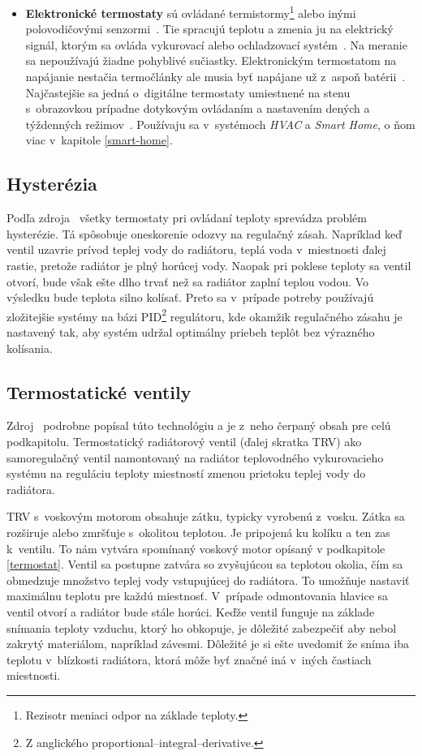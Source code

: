 \begin{itemize}
\item \textbf{Elektronické termostaty} sú ovládané termistormy\footnote{Rezisotr meniaci odpor na základe teploty.} alebo inými polovodičovými senzormi~\cite{challi_heating_2020}. 
Tie spracujú teplotu a zmenia ju na elektrický signál, ktorým sa ovláda vykurovací alebo ochladzovací systém~\cite{challi_heating_2020,robinson_2022}. 
Na meranie sa nepoužívajú žiadne pohyblivé sučiastky. 
Elektronickým termostatom na napájanie nestačia termočlánky ale musia byť napájane už z~aspoň batérii~\cite{robinson_2022}. 
Najčastejšie sa jedná o~digitálne termostaty umiestnené na stenu s~obrazovkou prípadne dotykovým ovládaním a nastavením dených a týždenných režimov~\cite{robinson_2022}. 
Používaju sa v~systémoch \emph{HVAC} a \emph{Smart Home}, o ňom viac v~kapitole \ref{smart-home}.
\end{itemize}

\subsection{Hysterézia}\label{Hyster}
Podľa zdroja~\cite{cadence_2022} všetky termostaty pri ovládaní teploty sprevádza problém hysterézie. 
Tá spôsobuje oneskorenie odozvy na regulačný zásah. 
Napríklad keď ventil uzavrie prívod teplej vody do radiátoru, teplá voda v~miestnosti ďalej rastie, pretože radiátor je plný horúcej vody. 
Naopak pri poklese teploty sa ventil otvorí, bude však ešte dlho trvať než sa radiátor zaplní teplou vodou. Vo výsledku bude teplota silno kolísať. 
Preto sa v~prípade potreby používajú zložitejšie systémy na bázi PID\footnote{Z anglického proportional–integral–derivative.} regulátoru, kde okamžik regulačného zásahu je nastavený tak, aby systém udržal optimálny priebeh teplôt bez výrazného kolísania.

\subsection{Termostatické ventily}\label{TRV}
Zdroj~\cite{castrads_2022} podrobne popísal túto technológiu a je z~neho čerpaný obsah pre celú podkapitolu.
Termostatický radiátorový ventil (ďalej skratka TRV) ako samoregulačný ventil namontovaný na radiátor teplovodného vykurovacieho systému na reguláciu teploty miestností zmenou prietoku teplej vody do radiátora.

TRV s~voskovým motorom obsahuje zátku, typicky vyrobenú z~vosku. 
Zátka sa rozširuje alebo zmršťuje s~okolitou teplotou. 
Je pripojená ku kolíku a ten zas k~ventilu. 
To nám vytvára spomínaný voskový motor opísaný v podkapitole \ref{termostat}. 
Ventil sa postupne zatvára so zvyšujúcou sa teplotou okolia, čím sa obmedzuje množstvo teplej vody vstupujúcej do radiátora. To umožňuje nastaviť maximálnu teplotu pre každú miestnosť. V~prípade odmontovania hlavice sa ventil otvorí a radiátor bude stále horúci.
Keďže ventil funguje na základe snímania teploty vzduchu, ktorý ho obkopuje, je dôležité zabezpečiť aby nebol zakrytý materiálom, napríklad závesmi.
Dôležité je si ešte uvedomiť že sníma iba teplotu v~blízkosti radiátora, ktorá môže byť značné iná v~iných častiach miestnosti.

